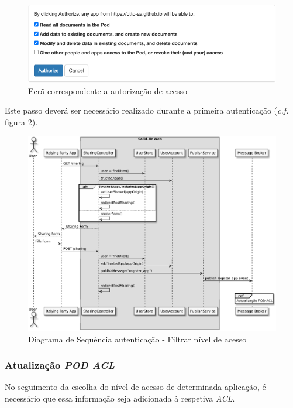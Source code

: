 \begin{figure}[H]
    \begin{center}
    \includegraphics[width=0.9 \textwidth]{figures/solid_filter_app_access.png}
    \caption{Ecrã correspondente a autorização de acesso}
            \label{figure_filter_app_access}
    \end{center}
\end{figure}

Este passo deverá ser necessário realizado durante a primeira autenticação (\emph{c.f.} figura \ref{autenticacao_sd2}).

\begin{figure}[H]
    \begin{center}
    \includegraphics[width=1 \textwidth]{figures/authentication_sd_2.eps}
    \caption{Diagrama de Sequência autenticação - Filtrar nível de acesso}
            \label{autenticacao_sd2}
    \end{center}
\end{figure}

\subsubsection{Atualização \emph{\acrshort{POD} \acrshort{ACL}}}
No seguimento da escolha do nível de acesso de determinada aplicação, é necessário que essa informação seja adicionada à respetiva \emph{\acrshort{ACL}}.

